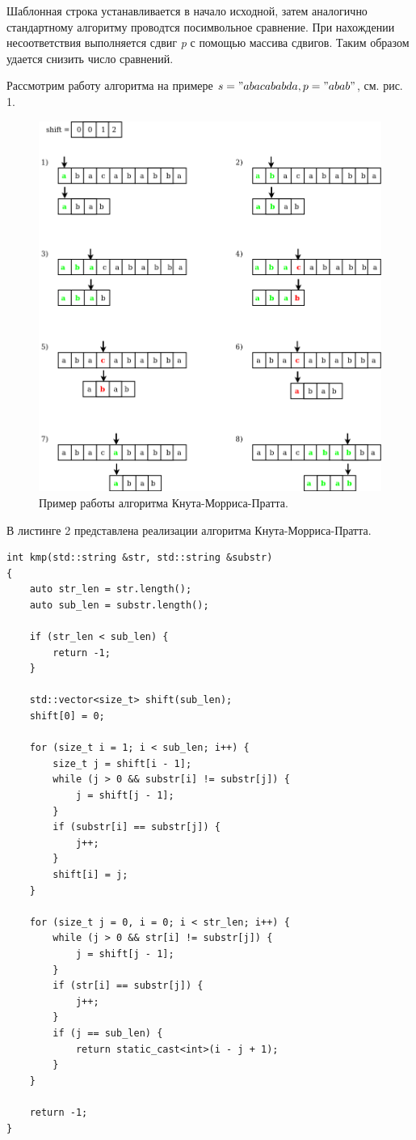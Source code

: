 \documentclass[12pt]{report}
\begin{document}
Шаблонная строка устанавливается в начало исходной, затем аналогично стандартному алгоритму проводтся посимвольное сравнение. При нахождении несоответствия выполняется сдвиг \textit{p} с помощью массива сдвигов. Таким образом удается снизить число сравнений.

Рассмотрим работу алгоритма на примере $s = "abacababda, p = "abab"$, см. рис. 1.
\begin{figure}[H]	
	{
		\centering
		\includegraphics[scale=0.40]{1.png}
		\caption{Пример работы алгоритма Кнута-Морриса-Пратта.}
		\label{pic:ant_schema}
	}
\end{figure}

В листинге 2 представлена реализации алгоритма Кнута-Морриса-Пратта.
\begin{lstlisting}[frame=single,caption=Алгоритм Кнута-Морриса-Пратта, breaklines]
int kmp(std::string &str, std::string &substr)
{
	auto str_len = str.length();
	auto sub_len = substr.length();
	
	if (str_len < sub_len) {
		return -1;
	}
	
	std::vector<size_t> shift(sub_len);
	shift[0] = 0;
	
	for (size_t i = 1; i < sub_len; i++) {
		size_t j = shift[i - 1];
		while (j > 0 && substr[i] != substr[j]) {
			j = shift[j - 1];
		}
		if (substr[i] == substr[j]) {
			j++;
		}
		shift[i] = j;
	}
	
	for (size_t j = 0, i = 0; i < str_len; i++) {
		while (j > 0 && str[i] != substr[j]) {
			j = shift[j - 1];
		}
		if (str[i] == substr[j]) {
			j++;
		}
		if (j == sub_len) {
			return static_cast<int>(i - j + 1);
		}
	}
	
	return -1;
}
\end{lstlisting}
\end{document}
